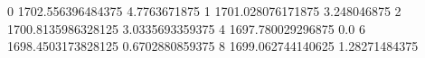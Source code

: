0 1702.556396484375 4.7763671875
1 1701.028076171875 3.248046875
2 1700.8135986328125 3.0335693359375
4 1697.780029296875 0.0
6 1698.4503173828125 0.6702880859375
8 1699.062744140625 1.28271484375
